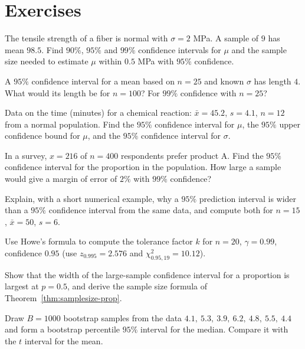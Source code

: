 \section{Exercises}

\begin{exercise}
The tensile strength of a fiber is normal with $\sigma=2$ MPa. A sample of $9$ has mean $98.5$. Find $90\%$, $95\%$ and $99\%$ confidence intervals for $\mu$ and the sample size needed to estimate $\mu$ within $0.5$ MPa with $95\%$ confidence.
\end{exercise}

\begin{exercise}
A $95\%$ confidence interval for a mean based on $n=25$ and known $\sigma$ has length $4$. What would its length be for $n=100$? For $99\%$ confidence with $n=25$?
\end{exercise}

\begin{exercise}
Data on the time (minutes) for a chemical reaction: $\bar{x}=45.2$, $s=4.1$, $n=12$ from a normal population. Find the $95\%$ confidence interval for $\mu$, the $95\%$ upper confidence bound for $\mu$, and the $95\%$ confidence interval for $\sigma$.
\end{exercise}

\begin{exercise}
In a survey, $x=216$ of $n=400$ respondents prefer product A. Find the $95\%$ confidence interval for the proportion in the population. How large a sample would give a margin of error of $2\%$ with $99\%$ confidence?
\end{exercise}

\begin{exercise}
Explain, with a short numerical example, why a $95\%$ prediction interval is wider than a $95\%$ confidence interval from the same data, and compute both for $n=15$, $\bar{x}=50$, $s=6$.
\end{exercise}

\begin{exercise}
Use Howe's formula to compute the tolerance factor $k$ for $n=20$, $\gamma=0.99$, confidence $0.95$ (use $z_{0.995}=2.576$ and $\chi^2_{0.95,19}=10.12$).
\end{exercise}

\begin{exercise}
Show that the width of the large-sample confidence interval for a proportion is largest at $p=0.5$, and derive the sample size formula of Theorem~\ref{thm:samplesize-prop}.
\end{exercise}

\begin{exercise}
Draw $B=1000$ bootstrap samples from the data $4.1,\ 5.3,\ 3.9,\ 6.2,\ 4.8,\ 5.5,\ 4.4$ and form a bootstrap percentile $95\%$ interval for the median. Compare it with the $t$ interval for the mean.
\end{exercise}
